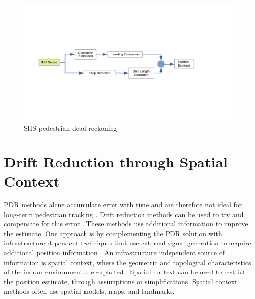 \label{sec:rw-SHS}
\begin{figure}[H]
	\centering
	\includegraphics[trim=40 120 140 100, clip,width=\linewidth]{images/shs_diagram}
	\caption{\ac{SHS} pedestrian dead reckoning}
	\label{fig:shs_diagram}
\end{figure}


\section{Drift Reduction through Spatial Context}
\label{sec:rw-drift_reduction}
PDR methods alone accumulate error with time and are therefore not ideal for long-term pedestrian tracking \cite{Hardegger2012}. Drift reduction methods can be used to try and compensate for this error \cite{MunozDiaz2019a}.  These methods use additional information to improve the estimate. One approach is by complementing the \ac{PDR} solution with infrastructure dependent techniques that use external signal generation to acquire additional position information \cite{Qian2015}. An infrastructure independent source of information is spatial context, where the geometric and topological characteristics of the indoor environment are exploited \cite{Gu2019}. Spatial context can be used to restrict the position estimate, through assumptions or simplifications. Spatial context methods often use spatial models, maps, and landmarks.\par

